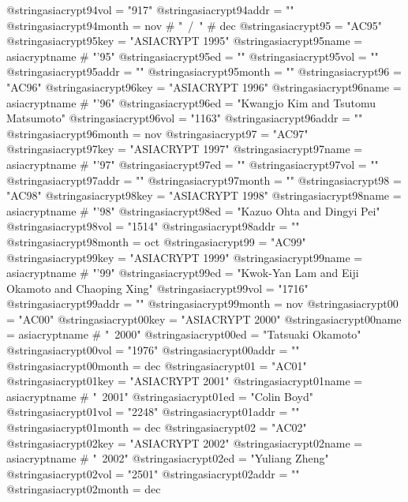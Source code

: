 @string{asiacrypt94vol =        "917"}
@string{asiacrypt94addr =       ""}
@string{asiacrypt94month =      nov # "~/~" # dec}
@string{asiacrypt95 =           "AC95"}
@string{asiacrypt95key =        "ASIACRYPT 1995"}
@string{asiacrypt95name =       asiacryptname # "'95"}
@string{asiacrypt95ed =         ""}
@string{asiacrypt95vol =        ""}
@string{asiacrypt95addr =       ""}
@string{asiacrypt95month =      ""}
@string{asiacrypt96 =           "AC96"}
@string{asiacrypt96key =        "ASIACRYPT 1996"}
@string{asiacrypt96name =       asiacryptname # "'96"}
@string{asiacrypt96ed =         "Kwangjo Kim and Tsutomu Matsumoto"}
@string{asiacrypt96vol =        "1163"}
@string{asiacrypt96addr =       ""}
@string{asiacrypt96month =      nov}
@string{asiacrypt97 =           "AC97"}
@string{asiacrypt97key =        "ASIACRYPT 1997"}
@string{asiacrypt97name =       asiacryptname # "'97"}
@string{asiacrypt97ed =         ""}
@string{asiacrypt97vol =        ""}
@string{asiacrypt97addr =       ""}
@string{asiacrypt97month =      ""}
@string{asiacrypt98 =           "AC98"}
@string{asiacrypt98key =        "ASIACRYPT 1998"}
@string{asiacrypt98name =       asiacryptname # "'98"}
@string{asiacrypt98ed =         "Kazuo Ohta and Dingyi Pei"}
@string{asiacrypt98vol =        "1514"}
@string{asiacrypt98addr =       ""}
@string{asiacrypt98month =      oct}
@string{asiacrypt99 =           "AC99"}
@string{asiacrypt99key =        "ASIACRYPT 1999"}
@string{asiacrypt99name =       asiacryptname # "'99"}
@string{asiacrypt99ed =         "Kwok-Yan Lam and Eiji Okamoto and Chaoping Xing"}
@string{asiacrypt99vol =        "1716"}
@string{asiacrypt99addr =       ""}
@string{asiacrypt99month =      nov}
@string{asiacrypt00 =           "AC00"}
@string{asiacrypt00key =        "ASIACRYPT 2000"}
@string{asiacrypt00name =       asiacryptname # "~2000"}
@string{asiacrypt00ed =         "Tatsuaki Okamoto"}
@string{asiacrypt00vol =        "1976"}
@string{asiacrypt00addr =       ""}
@string{asiacrypt00month =      dec}
@string{asiacrypt01 =           "AC01"}
@string{asiacrypt01key =        "ASIACRYPT 2001"}
@string{asiacrypt01name =       asiacryptname # "~2001"}
@string{asiacrypt01ed =         "Colin Boyd"}
@string{asiacrypt01vol =        "2248"}
@string{asiacrypt01addr =       ""}
@string{asiacrypt01month =      dec}
@string{asiacrypt02 =           "AC02"}
@string{asiacrypt02key =        "ASIACRYPT 2002"}
@string{asiacrypt02name =       asiacryptname # "~2002"}
@string{asiacrypt02ed =         "Yuliang Zheng"}
@string{asiacrypt02vol =        "2501"}
@string{asiacrypt02addr =       ""}
@string{asiacrypt02month =      dec}
